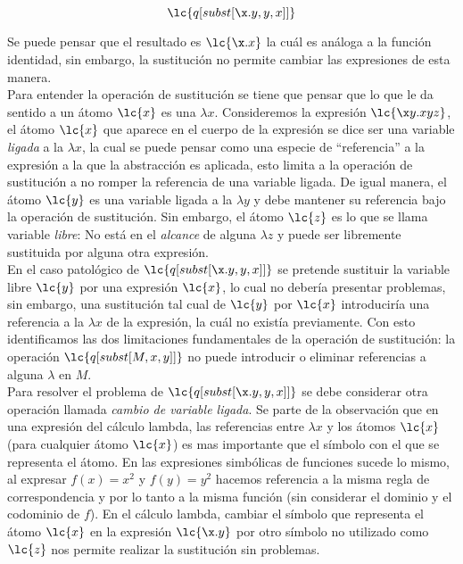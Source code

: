 \[\lc{q[subst[\x.y,y,x]]}\]

Se puede pensar que el resultado es \(\lc{\x.x}\) la cuál es análoga a la
función identidad, sin embargo, la sustitución no permite cambiar las
expresiones de esta manera. \\

Para entender la operación de sustitución se tiene que pensar que lo que le da
sentido a un átomo \(\lc{x}\) es una \(\lambda x\). Consideremos la expresión
\(\lc{\x y.x y z}\), el átomo \(\lc{x}\) que aparece en el cuerpo de la
expresión se dice ser una variable \emph{ligada} a la \(\lambda x\), la cual se
puede pensar como una especie de ``referencia'' a la expresión a la que la
abstracción es aplicada, esto limita a la operación de sustitución a no romper
la referencia de una variable ligada. De igual manera, el átomo \(\lc{y}\) es
una variable ligada a la \(\lambda y\) y debe mantener su referencia bajo la
operación de sustitución. Sin embargo, el átomo \(\lc{z}\) es lo que se llama
variable \emph{libre}: No está en el \emph{alcance} de alguna
\(\lambda z\) y puede ser libremente sustituida por alguna otra expresión. \\

En el caso patológico de \(\lc{q[subst[\x.y,y,x]]}\) se pretende sustituir la
variable libre \(\lc{y}\) por una expresión \(\lc{x}\), lo cual no debería
presentar problemas, sin embargo, una sustitución tal cual de \(\lc{y}\) por
\(\lc{x}\) introduciría una referencia a la \(\lambda x\) de la expresión, la
cuál no existía previamente. Con esto identificamos las dos limitaciones
fundamentales de la operación de sustitución: la operación
\(\lc{q[subst[M,x,y]]}\) no puede introducir o eliminar referencias a alguna
\(\lambda\) en \(M\). \\

Para resolver el problema de \(\lc{q[subst[\x.y,y,x]]}\) se debe considerar otra
operación llamada \emph{cambio de variable ligada}. Se parte de la observación
que en una expresión del cálculo lambda, las referencias entre \(\lambda x\) y
los átomos \(\lc{x}\) (para cualquier átomo \(\lc{x}\)) es mas importante que el
símbolo con el que se representa el átomo. En las expresiones simbólicas de
funciones sucede lo mismo, al expresar \(f(x)=x^{2}\) y \(f(y)=y^{2}\) hacemos
referencia a la misma regla de correspondencia y por lo tanto a la misma función
(sin considerar el dominio y el codominio de \(f\)). En el cálculo lambda,
cambiar el símbolo que representa el átomo \(\lc{x}\) en la expresión
\(\lc{\x.y}\) por otro símbolo no utilizado como \(\lc{z}\) nos permite realizar
la sustitución sin problemas.

